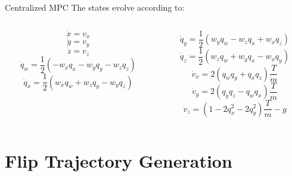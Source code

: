 \documentclass{thesisbeamer}
\begin{document}
\begin{frame}[t]{Centralized MPC} \vspace{4pt}
    The states evolve according to:
    \begin{columns}
        \begin{column}{0.5\textwidth}
            \begin{equation*}
                \dot{x} = v_x
            \end{equation*}
            \begin{equation*}
                \dot{y} = v_y
            \end{equation*}
            \begin{equation*}
                \dot{z} = v_z
            \end{equation*}
            \begin{equation*}
                \dot{q}_w=\frac{1}{2}( - w_x q_x - w_y q_y - w_z q_z)
            \end{equation*}
            \begin{equation*}
                \dot{q}_x=\frac{1}{2}( w_x q_w + w_z q_y - w_y q_z)
            \end{equation*}
        \end{column}
        \begin{column}{0.5\textwidth}
            \begin{equation*}
                \dot{q}_y=\frac{1}{2}( w_y q_w - w_z q_x + w_x q_z)
            \end{equation*}
            \begin{equation*}
                \dot{q}_z=\frac{1}{2}( w_z q_w + w_y q_x - w_x q_y)
            \end{equation*}
            \begin{equation*}
                \dot{v}_x = 2( q_w q_y + q_x q_z )\frac{T}{m}
            \end{equation*}
            \begin{equation*}
                \dot{v}_y = 2(q_y q_z - q_w q_x )\frac{T}{m}
            \end{equation*}
            \begin{equation*}
                \dot{v}_z = ( 1 - 2 q_x^2 - 2 q_y^2 )\frac{T}{m} - g
            \end{equation*}
        \end{column}
    \end{columns}
\end{frame}


\section{Flip Trajectory Generation}
\end{document}
